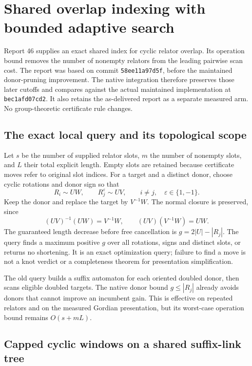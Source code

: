 \section{Shared overlap indexing with bounded adaptive search}
\label{sec:joint-overlap-native}

Report 46 supplies an exact shared index for cyclic relator overlap. Its
operation bound removes the number of nonempty relators from the leading
pairwise scan cost. The report was based on commit \texttt{58ee11a97d5f},
before the maintained donor-pruning improvement. The native integration
therefore preserves those later cutoffs and compares against the actual
maintained implementation at \texttt{bec1afd07cd2}. It also retains the
as-delivered report as a separate measured arm. No group-theoretic
certificate rule changes.

\subsection{The exact local query and its topological scope}

Let $s$ be the number of supplied relator slots, $m$ the number of nonempty
slots, and $L$ their total explicit length. Empty slots are retained because
certificate moves refer to original slot indices. For a target and a
distinct donor, choose cyclic rotations and donor sign so that
\[
 R_i\sim UW,\qquad R_j^{\varepsilon}\sim UV,
 \qquad i\ne j,\quad \varepsilon\in\{1,-1\}.
\]
Keep the donor and replace the target by $V^{-1}W$. The normal closure
is preserved, since
\[
 (UV)^{-1}(UW)=V^{-1}W,\qquad (UV)(V^{-1}W)=UW.
\]
The guaranteed length decrease before free cancellation is $g=2|U|-|R_j|$. The query finds a maximum positive $g$ over
all rotations, signs and distinct slots, or returns no shortening.
It is an exact optimization query; failure to find a move is not a knot
verdict or a completeness theorem for presentation simplification.

The old query builds a suffix automaton for each oriented doubled donor,
then scans eligible doubled targets. The native donor bound
$g\le |R_j|$ already avoids donors that cannot improve an incumbent gain.
This is effective on repeated relators and on the measured Gordian
presentation, but its worst-case operation bound remains $O(s+mL)$.

\subsection{Capped cyclic windows on a shared suffix-link tree}

